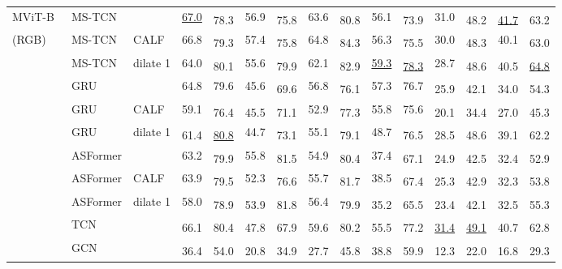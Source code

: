 \documentclass[runningheads]{llncs}
\newcommand{\best}[1]{\underline{#1}}
\newcommand{\nms}{\textsuperscript{\textdagger}}
\begin{document}
\begin{table*}[p]
{\begin{tabularx}{\textwidth}{lll
        rr
        rr
        rr
        rr
        rr
        rr
    }
        \cmidrule{2-15}
        MViT-B~\cite{mvit}
        & MS-TCN &
            & \best{67.0} & \nms 78.3 & 56.9 & \nms 75.8 & 63.6 & \nms 80.8 & 56.1 & \nms 73.9 & 31.0 & \nms 48.2 & \nms \best{41.7} & \nms 63.2 \\

        (RGB)
        & MS-TCN & CALF
            & 66.8 & \nms 79.3 & 57.4 & \nms 75.8 & 64.8 & \nms 84.3 & 56.3 & \nms 75.5 & 30.0 & \nms 48.3 & 40.1 & \nms 63.0 \\

        & MS-TCN & dilate 1
            & 64.0 & \nms 80.1 & 55.6 & \nms 79.9 & 62.1 & \nms 82.9 & \best{59.3} & \nms \best{78.3} & 28.7 & \nms 48.6 & \nms 40.5 & \nms \best{64.8} \\

        \cmidrule{2-15}
        & GRU &
            & 64.8 & 79.6 & 45.6 & \nms 69.6 & 56.8 & \nms 76.1 & 57.3 & 76.7 & \nms 25.9 & \nms 42.1 & \nms 34.0 & \nms 54.3 \\

        & GRU & CALF
            & 59.1 & \nms 76.4 & \nms 45.5 & \nms 71.1 & 52.9 & \nms 77.3 & 55.8 & 75.6 & \nms 20.1 & \nms 34.4 & \nms 27.0 & \nms 45.3 \\

        & GRU & dilate 1
            & \nms 61.4 & \nms \best{80.8} & 44.7 & \nms 73.1 & 55.1 & \nms 79.1 & 48.7 & \nms 76.5 & \nms 28.5 & \nms 48.6 & \nms 39.1 & \nms 62.2 \\

        \cmidrule{2-15}
        & ASFormer &
            & 63.2 & \nms 79.9 & 55.8 & \nms 81.5 & 54.9 & \nms 80.4 & 37.4 & \nms 67.1 & \nms 24.9 & \nms 42.5 & \nms 32.4 & \nms 52.9 \\
        & ASFormer & CALF
            & 63.9 & \nms 79.5 & 52.3 & \nms 76.6 & 55.7 & \nms 81.7 & 38.5 & \nms 67.4 & \nms 25.3 & \nms 42.9 & \nms 32.3 & \nms 53.8 \\
        & ASFormer & dilate 1
            & 58.0 & \nms 78.9 & \nms 53.9 & \nms 81.8 & 56.4 & \nms 79.9 & \nms 35.2 & \nms 65.5 & \nms 23.4 & \nms 42.1 & \nms 32.5 & \nms 55.3 \\

        \cmidrule{2-15}
        & TCN &
            & \nms 66.1 & \nms 80.4 & \nms 47.8 & \nms 67.9 & \nms 59.6 & \nms 80.2 & \nms 55.5 & \nms 77.2 & \nms \best{31.4} & \nms \best{49.1} & \nms 40.7 & \nms 62.8 \\

        & GCN &
            & \nms 36.4 & \nms 54.0 & \nms 20.8 & \nms 34.9 & \nms 27.7 & \nms 45.8 & \nms 38.8 & \nms 59.9 & \nms 12.3 & \nms 22.0 & \nms 16.8 & \nms 29.3 \\


\end{tabularx}}
\end{table*}
\end{document}
